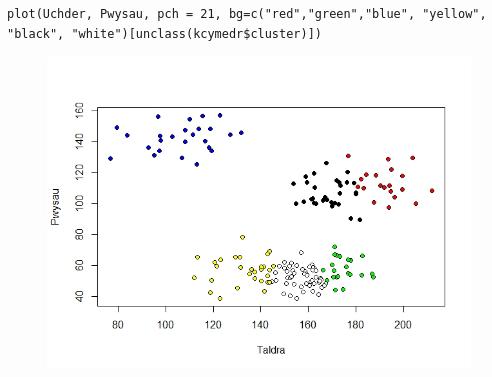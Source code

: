 \begin{verbatim}
plot(Uchder, Pwysau, pch = 21, bg=c("red","green","blue", "yellow", "black", "white")[unclass(kcymedr$cluster)])
\end{verbatim}

\begin{figure}[h]
\includegraphics[width=0.5\linewidth]{../img/6clwstwrR.jpeg}
\end{figure}



